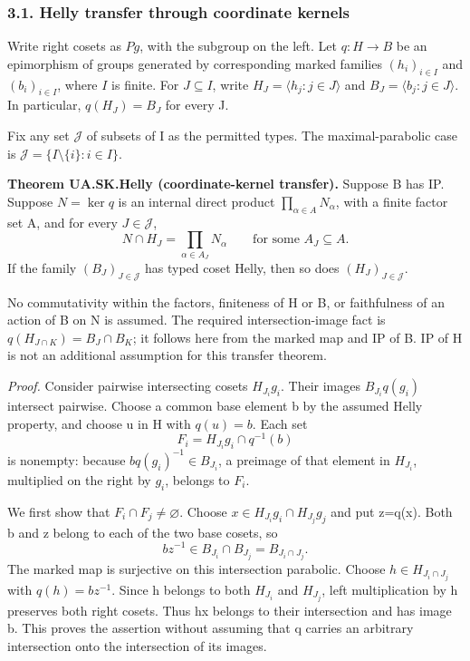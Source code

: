 \documentclass[
  11pt,
  a4paper,
]{article}
\begin{document}
\subsubsection{3.1. Helly transfer through coordinate
kernels}\label{helly-transfer-through-coordinate-kernels}

Write right cosets as \(P g\), with the subgroup on the left. Let
\(q:H\to B\) be an epimorphism of groups generated by corresponding
marked families \((h_i)_{i\in I}\) and \((b_i)_{i\in I}\), where \(I\)
is finite. For \(J\subseteq I\), write \(H_J=\langle h_j:j\in J\rangle\)
and \(B_J=\langle b_j:j\in J\rangle\). In particular, \(q(H_J)=B_J\) for
every J.

Fix any set \(\mathcal J\) of subsets of I as the permitted types. The
maximal-parabolic case is \(\mathcal J=\{I\setminus\{i\}:i\in I\}\).

\textbf{Theorem UA.SK.Helly (coordinate-kernel transfer).} Suppose B has
IP. Suppose \(N=\ker q\) is an internal direct product
\(\prod_{\alpha\in A}N_\alpha\), with a finite factor set A, and for
every \(J\in\mathcal J\), \[
 N\cap H_J=\prod_{\alpha\in A_J}N_\alpha
 \qquad\text{for some }A_J\subseteq A.
 \tag{H1}
\] If the family \((B_J)_{J\in\mathcal J}\) has typed coset Helly, then
so does \((H_J)_{J\in\mathcal J}\).

No commutativity within the factors, finiteness of H or B, or
faithfulness of an action of B on N is assumed. The required
intersection-image fact is \(q(H_{J\cap K})=B_J\cap B_K\); it follows
here from the marked map and IP of B. IP of H is not an additional
assumption for this transfer theorem.

\emph{Proof.} Consider pairwise intersecting cosets \(H_{J_i}g_i\).
Their images \(B_{J_i}q(g_i)\) intersect pairwise. Choose a common base
element b by the assumed Helly property, and choose u in H with
\(q(u)=b\). Each set \[
 F_i=H_{J_i}g_i\cap q^{-1}(b)
\] is nonempty: because \(bq(g_i)^{-1}\in B_{J_i}\), a preimage of that
element in \(H_{J_i}\), multiplied on the right by \(g_i\), belongs to
\(F_i\).

We first show that \(F_i\cap F_j\ne\varnothing\). Choose
\(x\in H_{J_i}g_i\cap H_{J_j}g_j\) and put z=q(x). Both b and z belong
to each of the two base cosets, so \[
 bz^{-1}\in B_{J_i}\cap B_{J_j}=B_{J_i\cap J_j}.
\] The marked map is surjective on this intersection parabolic. Choose
\(h\in H_{J_i\cap J_j}\) with \(q(h)=bz^{-1}\). Since h belongs to both
\(H_{J_i}\) and \(H_{J_j}\), left multiplication by h preserves both
right cosets. Thus hx belongs to their intersection and has image b.
This proves the assertion without assuming that q carries an arbitrary
intersection onto the intersection of its images.
\end{document}
